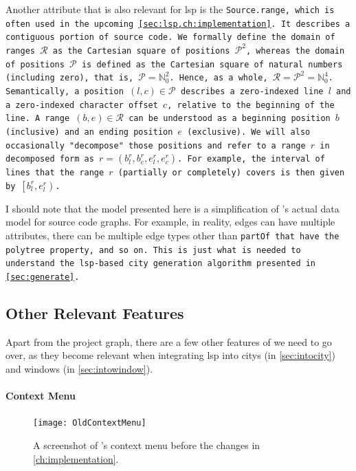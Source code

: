\documentclass[../thesis]{subfiles}
\begin{document}
Another attribute that is also relevant for \gls{lsp} is the \tt{Source.\allowbreak\Gls*{range}}, which is often used in the upcoming \cref{sec:lsp,ch:implementation}.
It describes a contiguous portion of source code.
We formally define the domain of ranges $\mathcal{R}$ as the Cartesian square of positions $\mathcal{P}^2$, whereas the domain of positions $\mathcal{P}$ is defined as the Cartesian square of natural numbers (including zero), that is, $\mathcal{P} = \mathbb{N}^2_0$.
Hence, as a whole, $\mathcal{R} = \mathcal{P}^2 = \mathbb{N}^4_0$.
Semantically, a position $(l, c) \in \mathcal{P}$ describes a zero-indexed line $l$ and a zero-indexed character offset $c$, relative to the beginning of the line.
A range $(b, e) \in \mathcal{R}$ can be understood as a beginning position $b$ (inclusive) and an ending position $e$ (exclusive).
We will also occasionally "decompose" those positions and refer to a range $r$ in decomposed form as $r = \left(b_l^r, b_c^r, e_l^r, e_c^r\right)$.
For example, the interval of lines that the range $r$ (partially or completely) covers is then given by $\left[b_l^r, e_l^r\right)$.

I should note that the model presented here is a simplification of \SEE{}'s actual data model for source code graphs.
For example, in reality, edges can have multiple attributes, there can be multiple edge types other than \tt{partOf} that have the \gls{polytree} property, and so on.
This is just what is needed to understand the \gls{lsp}-based city generation algorithm presented in \cref{sec:generate}.

\subsection{Other Relevant Features}\label{subsec:seeother}

Apart from the project graph, there are a few other features of \SEE{} we need to go over, as they become relevant when integrating \gls{lsp} into \glspl{city} (in \cref{sec:intocity}) and \glspl{window} (in \cref{sec:intowindow}).

\paragraph{Context Menu}

\begin{figure}
	\begin{center}
		\texttt{[image: OldContextMenu]}
	\end{center}
	\caption{A screenshot of \SEE{}'s context menu before the changes in \cref{ch:implementation}.}\label{fig:oldcontext}
\end{figure}
\end{document}
